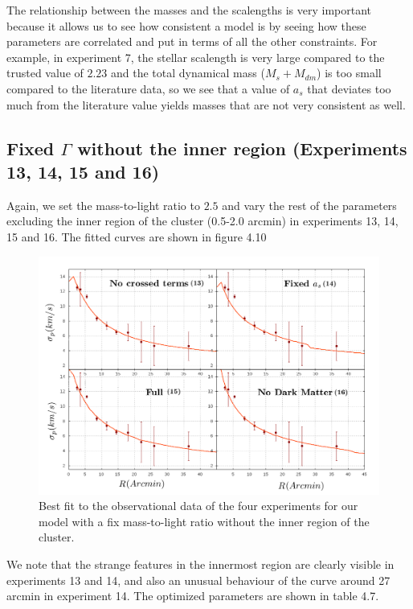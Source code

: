 The relationship between the masses and the scalengths is very important because it allows us to see how consistent a model is by seeing how these parameters are correlated and put in terms of all the other constraints. For example, in experiment 7, the stellar scalength is very large compared to the trusted value of $2.23$ and the total dynamical mass ($M_{s}+M_{dm}$) is too small compared to the literature data, so we see that a value of $a_s$ that deviates too much from the literature value yields masses that are not very consistent as well.  

\subsection{Fixed $\Gamma$ without the inner region (Experiments 13, 14, 15 and 16)}

Again, we set the mass-to-light ratio to $2.5$ and vary the rest of the parameters excluding the inner region of the cluster (0.5-2.0 arcmin) in experiments 13, 14, 15 and 16. The fitted curves are shown in figure 4.10

\begin{figure}[H]
\centering
\includegraphics[width=15cm]{images/fix_gamma_refinado_10.png}
\caption[Best fit of our model with a fix mass-to-light ratio without the inner region]{Best fit to the observational data of the four experiments for our model with a fix mass-to-light ratio without the inner region of the cluster.}
\end{figure}

We note that the strange features in the innermost region are clearly visible in experiments 13 and 14, and also an unusual behaviour of the curve around 27 arcmin in experiment 14. The optimized parameters are shown in table 4.7.


